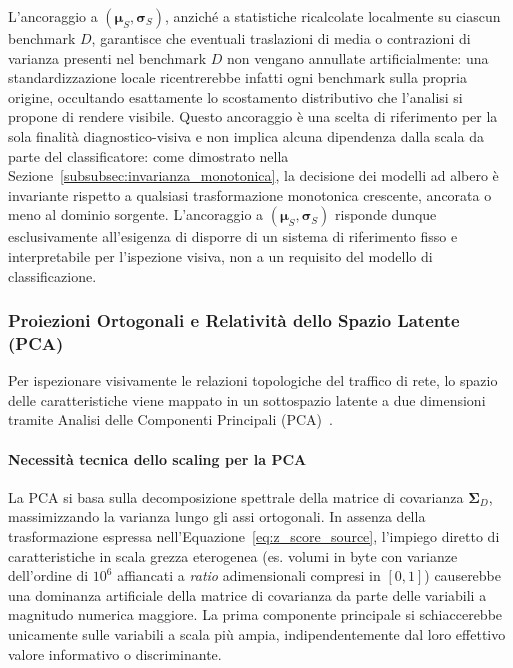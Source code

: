 L'ancoraggio a $(\boldsymbol{\mu}_S, \boldsymbol{\sigma}_S)$, anziché a statistiche ricalcolate localmente su ciascun benchmark $D$, garantisce che eventuali traslazioni di media o contrazioni di varianza presenti nel benchmark $D$ non vengano annullate artificialmente: una standardizzazione locale ricentrerebbe infatti ogni benchmark sulla propria origine, occultando esattamente lo scostamento distributivo che l'analisi si propone di rendere visibile. Questo ancoraggio è una scelta di riferimento per la sola finalità diagnostico-visiva e non implica alcuna dipendenza dalla scala da parte del classificatore: come dimostrato nella Sezione~\ref{subsubsec:invarianza_monotonica}, la decisione dei modelli ad albero è invariante rispetto a qualsiasi trasformazione monotonica crescente, ancorata o meno al dominio sorgente. L'ancoraggio a $(\boldsymbol{\mu}_S, \boldsymbol{\sigma}_S)$ risponde dunque esclusivamente all'esigenza di disporre di un sistema di riferimento fisso e interpretabile per l'ispezione visiva, non a un requisito del modello di classificazione.

\subsubsection{Proiezioni Ortogonali e Relatività dello Spazio Latente (PCA)}
\label{subsubsec:pca_relativita}
Per ispezionare visivamente le relazioni topologiche del traffico di rete, lo spazio delle caratteristiche viene mappato in un sottospazio latente a due dimensioni tramite Analisi delle Componenti Principali (PCA)~\cite{pearson1901, hotelling1933}.

\paragraph{Necessità tecnica dello scaling per la PCA}
La PCA si basa sulla decomposizione spettrale della matrice di covarianza $\boldsymbol{\Sigma}_D$, massimizzando la varianza lungo gli assi ortogonali. In assenza della trasformazione espressa nell'Equazione~\eqref{eq:z_score_source}, l'impiego diretto di caratteristiche in scala grezza eterogenea (es. volumi in byte con varianze dell'ordine di $10^6$ affiancati a \textit{ratio} adimensionali compresi in $[0,1]$) causerebbe una dominanza artificiale della matrice di covarianza da parte delle variabili a magnitudo numerica maggiore. La prima componente principale si schiaccerebbe unicamente sulle variabili a scala più ampia, indipendentemente dal loro effettivo valore informativo o discriminante.


